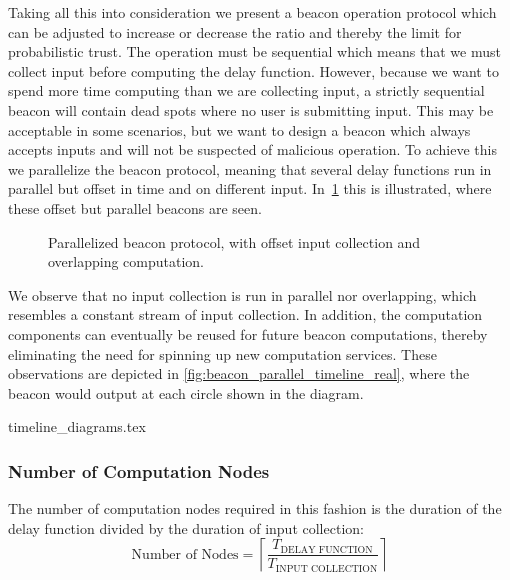 Taking all this into consideration we present a beacon operation protocol which can be adjusted to increase or decrease the ratio and thereby the limit for probabilistic trust.
The operation must be sequential which means that we must collect input before computing the delay function.
However, because we want to spend more time computing than we are collecting input, a strictly sequential beacon will contain dead spots where no user is submitting input.
This may be acceptable in some scenarios, but we want to design a beacon which always accepts inputs and will not be suspected of malicious operation.
To achieve this we parallelize the beacon protocol, meaning that several delay functions run in parallel but offset in time and on different input.
In~\cref{fig:beacon_parallel_timeline} this is illustrated, where these offset but parallel beacons are seen.
\begin{figure}[htb]
    \centering
    \footnotesize
    \caption{Parallelized beacon protocol, with offset input collection and overlapping computation.}\label{fig:beacon_parallel_timeline}
\end{figure}

We observe that no input collection is run in parallel nor overlapping, which resembles a constant stream of input collection.
In addition, the computation components can eventually be reused for future beacon computations, thereby eliminating the need for spinning up new computation services.
These observations are depicted in \cref{fig:beacon_parallel_timeline_real}, where the beacon would output at each circle shown in the diagram.

{timeline_diagrams.tex}

\subsubsection{Number of Computation Nodes}
The number of computation nodes required in this fashion is the duration of the delay function divided by the duration of input collection:
\begin{equation*}
    \text{Number of Nodes} = \left\lceil\frac{T_\text{DELAY FUNCTION}}{T_\text{INPUT COLLECTION}}\right\rceil
\end{equation*}

